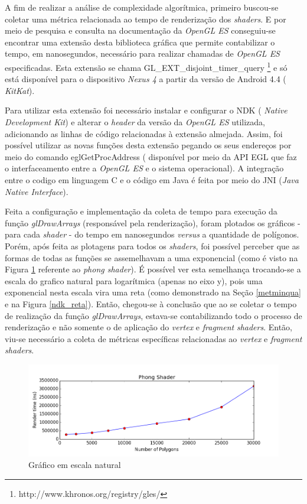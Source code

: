 	A fim de realizar a análise de complexidade algorítmica, primeiro buscou-se coletar uma métrica relacionada ao tempo de renderização dos \textit{shaders}. E por meio de pesquisa e consulta na documentação da \textit{OpenGL ES} conseguiu-se encontrar uma extensão desta biblioteca gráfica que permite contabilizar o tempo, em nanosegundos, necessário para realizar chamadas de \textit{OpenGL ES} especificadas. Esta extensão se chama GL\_EXT\_disjoint\_timer\_query \footnote{http://www.khronos.org/registry/gles/} e só está disponível para o dispositivo \textit{Nexus 4} a partir da versão de Android 4.4 ( \textit{KitKat}).

	Para utilizar esta extensão foi necessário instalar e configurar o NDK ( \textit{Native Development Kit}) e alterar o \textit{header} da versão da \textit{OpenGL ES} utilizada, adicionando as linhas de código relacionadas à extensão almejada. Assim, foi possível utilizar as novas funções desta extensão pegando os seus endereços por meio do comando eglGetProcAddress ( disponível por meio da API EGL que faz o interfaceamento entre a \textit{OpenGL ES} e o sistema operacional). A integração entre o codigo em linguagem C e o código em Java é feita por meio do JNI (\textit{Java Native Interface}).

	Feita a configuração e implementação da coleta de tempo para execução da função \textit{glDrawArrays} (responsável pela renderização), foram plotados os gráficos - para cada \textit{shader} - do tempo em nanosegundos \textit{versus} a quantidade de polígonos. Porém, após feita as plotagens para todos os \textit{shaders}, foi possível perceber que as formas de todas as funções se assemelhavam a uma exponencial (como é visto na Figura  \ref{ndk_exp} referente ao \textit{phong shader}). É possível ver esta semelhança trocando-se a escala do grafico natural para logarítmica (apenas no eixo y), pois uma exponencial nesta escala vira uma reta (como demonstrado na Seção \ref{metminqua} e na  Figura  \ref{ndk_reta}). Então, chegou-se à conclusão que ao se coletar o tempo de realização da função \textit{glDrawArrays}, estava-se contabilizando todo o processo de renderização e não somente o de aplicação do \textit{vertex} e  \textit{fragment}  \textit{shaders}. Então, viu-se necessário a coleta de métricas específicas relacionadas ao \textit{vertex} e \textit{fragment} \textit{shaders}. 

	\begin{figure}[h]
	\centering
		\includegraphics[keepaspectratio=true,scale=0.6]{figuras/ndk_exp.png}
	\caption{Gráfico em escala natural}
	\label{ndk_exp}
	\end{figure}

